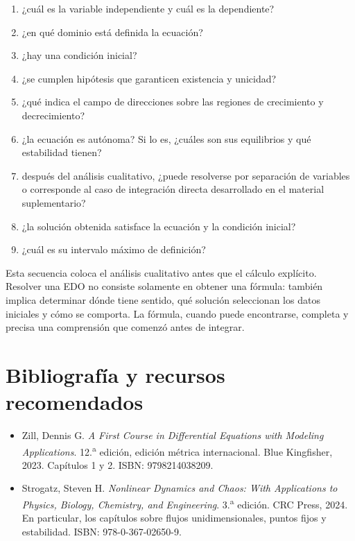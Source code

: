 \documentclass[12pt,a4paper]{article}
\begin{document}
	\begin{enumerate}[label=\arabic*.]
		\item ¿cuál es la variable independiente y cuál es la dependiente?
		\item ¿en qué dominio está definida la ecuación?
		\item ¿hay una condición inicial?
		\item ¿se cumplen hipótesis que garanticen existencia y unicidad?
		\item ¿qué indica el campo de direcciones sobre las regiones de crecimiento y decrecimiento?
		\item ¿la ecuación es autónoma? Si lo es, ¿cuáles son sus equilibrios y qué estabilidad tienen?
		\item después del análisis cualitativo, ¿puede resolverse por separación de variables o corresponde al caso de integración directa desarrollado en el material suplementario?
		\item ¿la solución obtenida satisface la ecuación y la condición inicial?
		\item ¿cuál es su intervalo máximo de definición?
	\end{enumerate}

	Esta secuencia coloca el análisis cualitativo antes que el cálculo explícito. Resolver una EDO no consiste solamente en obtener una fórmula: también implica determinar dónde tiene sentido, qué solución seleccionan los datos iniciales y cómo se comporta. La fórmula, cuando puede encontrarse, completa y precisa una comprensión que comenzó antes de integrar.

	\clearpage
	\section*{Bibliografía y recursos recomendados}

	\begin{itemize}[leftmargin=*]
		\item Zill, Dennis G. \textit{A First Course in Differential Equations with Modeling Applications}. 12.\textsuperscript{a} edición, edición métrica internacional. Blue Kingfisher, 2023. Capítulos 1 y 2. ISBN: 9798214038209.

		\item Strogatz, Steven H. \textit{Nonlinear Dynamics and Chaos: With Applications to Physics, Biology, Chemistry, and Engineering}. 3.\textsuperscript{a} edición. CRC Press, 2024. En particular, los capítulos sobre flujos unidimensionales, puntos fijos y estabilidad. ISBN: 978-0-367-02650-9.

	\end{itemize}
\end{document}
